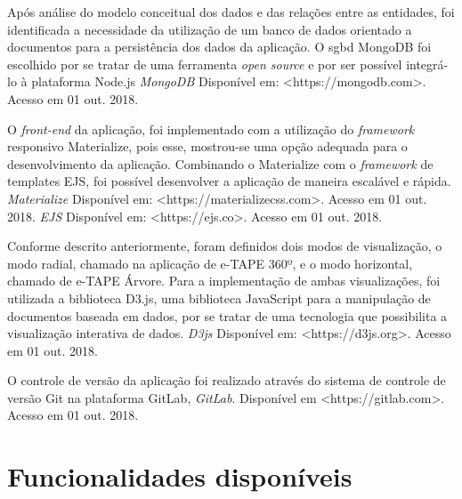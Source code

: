 \par
Após análise do modelo conceitual dos dados e das relações entre as entidades, foi identificada a necessidade da utilização de um banco de dados orientado a documentos para a persistência dos dados da aplicação. 
O \acrfull{sgbd} MongoDB foi escolhido por se tratar de uma ferramenta \textit{open source} e por ser possível integrá-lo à plataforma Node.js 
\textit{MongoDB} Disponível em: <https://mongodb.com>. Acesso em 01 out. 2018.

\par
O \textit{front-end} da aplicação, foi implementado com a utilização do \textit{framework} responsivo Materialize, pois esse, 
mostrou-se uma opção adequada para o desenvolvimento da aplicação. Combinando o Materialize com o \textit{framework} de templates EJS, 
foi possível desenvolver a aplicação de maneira escalável e rápida. \textit{Materialize} Disponível em: <https://materializecss.com>. Acesso em 01 out. 2018.
\textit{EJS} Disponível em: <https://ejs.co>. Acesso em 01 out. 2018.

\par
Conforme descrito anteriormente, foram definidos dois modos de visualização, o modo radial, chamado na aplicação de e-TAPE 360º, e o modo horizontal, 
chamado de e-TAPE Árvore. Para a implementação de ambas visualizações, foi utilizada a biblioteca D3.js, uma biblioteca JavaScript para a manipulação de documentos 
baseada em dados, por se tratar de uma tecnologia que possibilita a visualização interativa de dados.
\textit{D3js} Disponível em: <https://d3js.org>. Acesso em 01 out. 2018.

\par
O controle de versão da aplicação foi realizado através do sistema de controle de versão Git na plataforma GitLab, \textit{GitLab}. 
Disponível em <https://gitlab.com>. Acesso em 01 out. 2018.

\section{Funcionalidades disponíveis}
\label{sec:funcionamento}
